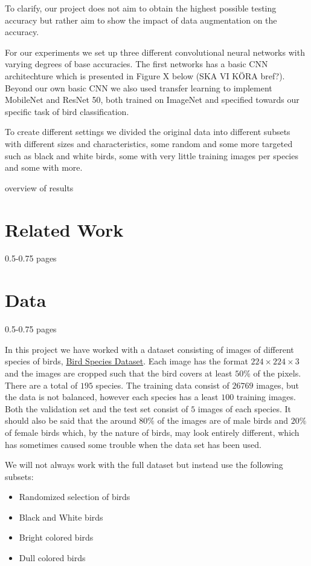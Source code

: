 \documentclass{article}
\begin{document}
To clarify, our project does not aim to obtain the highest possible testing accuracy but rather aim to show the impact of data augmentation 
on the accuracy. 

For our experiments we set up three different convolutional neural networks with varying degrees of base accuracies. The first networks has a basic CNN architechture which is presented in Figure X below (SKA VI KÖRA bref?). Beyond our own basic CNN we also used transfer learning to implement MobileNet and ResNet 50, both trained on ImageNet and specified towards our specific task of bird classification.

To create different settings we divided the original data into different subsets with different sizes and characteristics, some random and some more targeted such as black and white birds, some with very little training images per species and some with more.

overview of results

\section{Related Work}

0.5-0.75 pages




\section{Data}

0.5-0.75 pages

In this project we have worked with a dataset consisting of images of different species of birds, 
\href{https://www.kaggle.com/gpiosenka/100-bird-species}{Bird Species Dataset}. Each image has the format $224 \times 224 \times 3$ and the images are cropped such that the bird covers at least $50$\% of the pixels.
There are 
a total of $195$ species. The training data consist of $26769$ images, but the data is not balanced, however each species has a least $100$ training images. 
Both the validation set and the test set consist of $5$ images of each species. 
It should also be said that the around $80\%$ of the images are of male birds and $20\%$ of female 
birds which, by the nature of birds, may look entirely different, which has sometimes caused some trouble when the data set has been used.

We will not always work with the full dataset but instead use the following subsets:

\begin{itemize}
	\item Randomized selection of birds
	\item Black and White birds
	\item Bright colored birds
	\item Dull colored birds 
\end{itemize}
\end{document}
